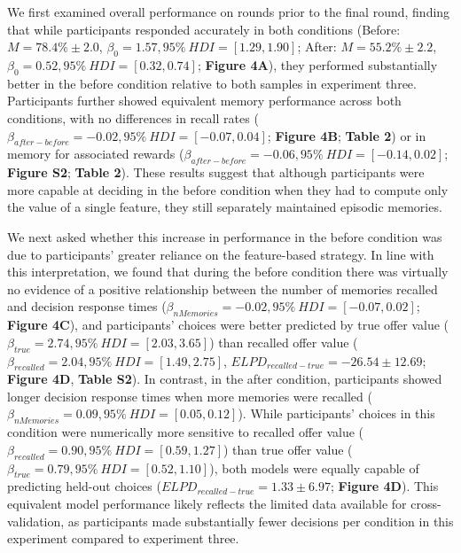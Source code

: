 \documentclass[10pt,letterpaper]{article}
\begin{document}
We first examined overall performance on rounds prior to the final round, finding that while participants responded accurately in both conditions (Before: $M = 78.4\% \pm 2.0$, $\beta_{0} = 1.57, 95\% \ HDI = [1.29, 1.90]$; After: $M = 55.2\% \pm 2.2$, $\beta_{0} = 0.52, 95\% \ HDI = [0.32, 0.74]$; \textbf{Figure 4A}), they performed substantially better in the before condition relative to both samples in experiment three. Participants further showed equivalent memory performance across both conditions, with no differences in recall rates ($\beta_{after-before} = -0.02, 95\% \ HDI = [-0.07, 0.04]$; \textbf{Figure 4B}; \textbf{Table 2}) or in memory for associated rewards ($\beta_{after-before} = -0.06, 95\% \ HDI = [-0.14, 0.02]$; \textbf{Figure S2}; \textbf{Table 2}). These results suggest that although participants were more capable at deciding in the before condition when they had to compute only the value of a single feature, they still separately maintained episodic memories.

We next asked whether this increase in performance in the before condition was due to participants' greater reliance on the feature-based strategy. In line with this interpretation, we found that during the before condition there was virtually no evidence of a positive relationship between the number of memories recalled and decision response times ($\beta_{nMemories} = -0.02, 95\% \ HDI = [-0.07, 0.02]$; \textbf{Figure 4C}), and participants' choices were better predicted by true offer value ($\beta_{true} = 2.74, 95\% \ HDI = [2.03, 3.65]$) than recalled offer value ($\beta_{recalled} = 2.04, 95\% \ HDI = [1.49, 2.75]$, $ELPD_{recalled-true} = -26.54 \pm 12.69$; \textbf{Figure 4D}, \textbf{Table S2}). In contrast, in the after condition, participants showed longer decision response times when more memories were recalled ($\beta_{nMemories} = 0.09, 95\% \ HDI = [0.05, 0.12]$). While participants' choices in this condition were numerically more sensitive to recalled offer value ($\beta_{recalled} = 0.90, 95\% \ HDI = [0.59, 1.27]$) than true offer value ($\beta_{true} = 0.79, 95\% \ HDI = [0.52, 1.10]$), both models were equally capable of predicting held-out choices ($ELPD_{recalled-true} = 1.33 \pm 6.97$; \textbf{Figure 4D}). This equivalent model performance likely reflects the limited data available for cross-validation, as participants made substantially fewer decisions per condition in this experiment compared to experiment three.
\end{document}

